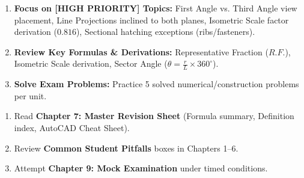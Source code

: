 \documentclass[a4paper,11pt,oneside,openany]{book}
\begin{document}
\begin{tcolorbox}[enhanced, colback=boxamberbg, colframe=brandamber, title={\textbf{Scenario B: Limited Time / Mid-Term Strategy (High-Yield Focus)}}, boxrule=1.2pt]
\begin{enumerate}
    \item \textbf{Focus on [HIGH PRIORITY] Topics:} First Angle vs. Third Angle view placement, Line Projections inclined to both planes, Isometric Scale factor derivation ($0.816$), Sectional hatching exceptions (ribs/fasteners).
    \item \textbf{Review Key Formulas \& Derivations:} Representative Fraction ($R.F.$), Isometric Scale derivation, Sector Angle ($\theta = \frac{r}{L} \times 360^\circ$).
    \item \textbf{Solve Exam Problems:} Practice 5 solved numerical/construction problems per unit.
\end{enumerate}
\end{tcolorbox}

\begin{tcolorbox}[enhanced, colback=boxrosebg, colframe=boxroseborder, title={\textbf{Scenario C: Last-Day Night Before Exam Strategy (Rapid Revision)}}, boxrule=1.2pt]
\begin{enumerate}
    \item Read \textbf{Chapter 7: Master Revision Sheet} (Formula summary, Definition index, AutoCAD Cheat Sheet).
    \item Review \textbf{Common Student Pitfalls} boxes in Chapters 1--6.
    \item Attempt \textbf{Chapter 9: Mock Examination} under timed conditions.
\end{enumerate}
\end{tcolorbox}
\end{document}
